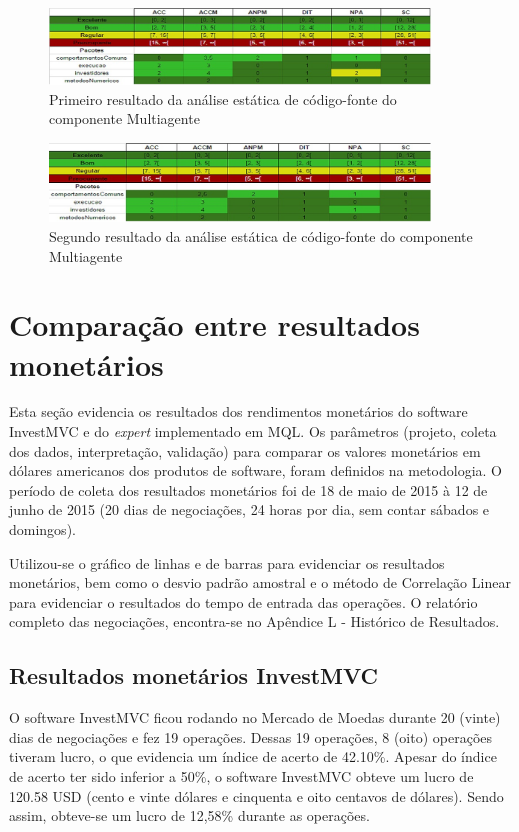 \begin{figure}[H]
\centering
\includegraphics[width=0.9\textwidth]{figuras/analiseinicial}
\caption{Primeiro resultado da análise estática de código-fonte do componente Multiagente}
\label{analiseinicial}
\end{figure}

\begin{figure}[H]
\centering
\includegraphics[width=0.9\textwidth]{figuras/analisefinal}
\caption{Segundo resultado da análise estática de código-fonte do componente Multiagente}
\label{analisefinal}
\end{figure}

\section{Comparação entre resultados monetários}
Esta seção evidencia os resultados dos rendimentos monetários do software InvestMVC e do \textit{expert} implementado em MQL. Os parâmetros (projeto, coleta dos dados, interpretação, validação) para comparar os valores monetários em dólares americanos dos produtos de software, foram definidos na metodologia. O período de coleta dos resultados monetários foi de 18 de maio de 2015 à 12 de junho de 2015 (20 dias de negociações, 24 horas por dia, sem contar sábados e domingos).

Utilizou-se o gráfico de linhas e de barras para evidenciar os resultados monetários, bem como o desvio padrão amostral e o método de Correlação Linear para evidenciar o resultados do tempo de entrada das operações. O relatório completo das negociações, encontra-se no Apêndice L - Histórico de Resultados.


\subsection{Resultados monetários InvestMVC}
O software InvestMVC ficou rodando no Mercado de Moedas durante 20 (vinte) dias de negociações e fez 19 operações. Dessas 19 operações, 8 (oito) operações tiveram lucro, o que evidencia um índice de acerto de 42.10\%. Apesar do índice de acerto ter sido inferior a 50\%, o software InvestMVC obteve um lucro de 120.58 USD (cento e vinte dólares e cinquenta e oito centavos de dólares). Sendo assim, obteve-se um lucro de 12,58\% durante as operações.

